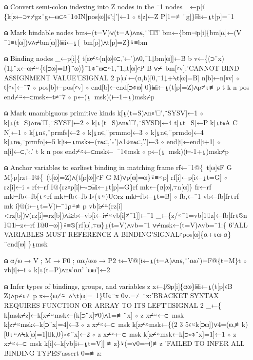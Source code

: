\documentclass{article}%
\begin{document}
⍝ Convert semi-colon indexing into Z nodes in the ¯1 nodes
         _←p[i]\{k[z←⊃⍪⌿gz¨g←⍵⊂⍨¯1⌽IN[pos[⍵]]∊';]']←1 ⋄ t[z]←Z P[1=≢¨g]\}⌸i←⍸t[p]=¯1

⍝ Mark bindable nodes
         bm←(t=V)∨(t=A)∧n∊,¨'⎕⍞'
         bm←\{bm⊣p[i]\{bm[⍺]←(V ¯1≡t[⍵])∨∧⌿bm[⍵]\}⌸i←⍸(~bm[p])∧t[p]=Z\}⍣≡bm

⍝ Binding nodes
         _←p[i]\{
                 t[⍵⌿⍨(n[⍵]∊⊂,'←')∧0,¯1↓bm[⍵]]←B
                 b v←\{(⊃¨x)(1↓¨x←⍵⌿⍨\{t[⊃⍵]=B\}¨⍵)\}¯1⌽¨⍵⊂⍨1,¯1↓t[⍵]∊P B
                 ∨⌿~bm[∊v]:'CANNOT BIND ASSIGNMENT VALUE'⎕SIGNAL 2
                 p[⍵]←(⍺,b)[0,¯1↓+⍀t[⍵]=B]
                 n[b]←n[∊v] ⋄ t[∊v]←¯7 ⋄ pos[b]←pos[∊v] ⋄ end[b]←end[⊃⌽⍵]
         0\}⌸i←⍸(t[p]=Z)∧p≠⍳≢p
         t k n pos end⌿⍨←⊂msk←t≠¯7 ⋄ p←(⍸~msk)(⊢-1+⍸)msk⌿p

⍝ Mark unambiguous primitive kinds
         k[⍸(t=S)∧n∊'⎕',¨SYSV]←1 ⋄ k[⍸(t=S)∧n∊'⎕',¨SYSF]←2 ⋄ k[⍸(t=S)∧n∊'⎕',¨SYSD]←4
         t[⍸t=S]←P
         k[⍸t∊A C N]←1 ⋄ k[⍸n∊,¨prmfs]←2 ⋄ k[⍸n∊,¨prmmo]←3 ⋄ k[⍸n∊,¨prmdo]←4
         k[⍸n∊,¨prmfo]←5
         k[i←⍸msk←(n∊⊂,'∘')∧1⌽n∊⊂,'.']←3 ⋄ end[i]←end[i+1] ⋄ n[i]←⊂,'∘.'
         t k n pos end⌿⍨←⊂msk←~¯1⌽msk ⋄ p←(⍸~msk)(⊢-1+⍸)msk⌿p

⍝ Anchor variables to earliest binding in matching frame
         rf←¯1@\{~t[⍵]∊F G M\}p[rz←I@\{~(t[⍵]=Z)∧(t[p[⍵]]∊F G M)∨p[⍵]=⍵\}⍣≡⍨p]
         rf[i]←p[i←⍸t=G] ⋄ rz[i]←i ⋄ rf←rf I@\{rz∊p[i]⊢∘⊃⌸i←⍸t[p]=G\}rf
         mk←\{⍺[⍵],⍪n[⍵]\}
         fr←rf mk⊢fb←fb[⍳⍨rf mk⊢fb←fb I∘(⍳⍨)U⊖rz mk⊢fb←⍸t=B] ⋄ fb,←¯1
         vb←fb[fr⍳rf mk i]@(i←⍸t=V)⊢¯1⍴⍨≢p
         vb[i⌿⍨(rz[i]<rz[b])∨(rz[i]=rz[b])∧i≥b←vb[i←i⌿⍨vb[i]≠¯1]]←¯1
         _←\{z/⍨¯1=vb[1⌷z]←fb[fr⍳⍉n I@1⊢z←rf I@0⊢⍵]\}⍣≡⍉\{rf[⍵],⍪⍵\}⍸(t=V)∧vb=¯1
         ∨⌿msk←(t=V)∧vb=¯1:\{
                 6'ALL VARIABLES MUST REFERENCE A BINDING'SIGNAL∊pos[⍵]\{⍺+⍳⍵-⍺\}¨end[⍵]
         \}⍸msk

⍝ ⍺/⍵ → V ; M → F0 ; ⍺⍺/⍵⍵ → P2
         t←V@(i←⍸(t=A)∧n∊,¨'⍺⍵')⊢F@\{t=M\}t ⋄ vb[i]←i ⋄ k[⍸(t=P)∧n∊'⍺⍺' '⍵⍵']←2

⍝ Infer types of bindings, groups, and variables
         z x←↓⍉p[i]\{⍺⍵\}⌸i←⍸(t[p]∊B Z)∧p≠⍳≢p
         x←\{⍵⌿⍨~∧⍀t[⍵]=¯1\}U⌽¨x
         0∨.=≢¨x:'BRACKET SYNTAX REQUIRES FUNCTION OR ARRAY TO ITS LEFT'⎕SIGNAL 2
         _←\{
                 k[msk⌿z]←k[x⌿⍨msk←(k[⊃¨x]≠0)∧1=≢¨x] ⋄ z x⌿⍨←⊂~msk
                 k[z⌿⍨msk←k[⊃¨x]=4]←3 ⋄ z x⌿⍨←⊂~msk
                 k[z⌿⍨msk←\{(2 3 5∊⍨k[⊃⍵])∨4=(⍵,≢k)[0⍳⍨∧⍀k[⍵]=1]⌷k,0\}∘⌽¨x]←2 ⋄ z x⌿⍨←⊂~msk
                 k[z⌿⍨msk←k[⊃∘⌽¨x]=1]←1 ⋄ z x⌿⍨←⊂~msk
                 k[i]←k[vb[i←⍸t=V]]
         ≢z\}⍣(=∨0=⊣)≢z
         'FAILED TO INFER ALL BINDING TYPES'assert 0=≢z:
\end{document}
